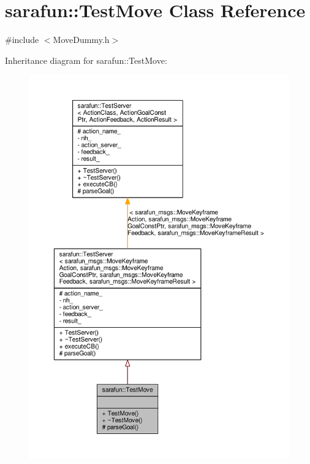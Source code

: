 \hypertarget{classsarafun_1_1TestMove}{\section{sarafun\-:\-:Test\-Move Class Reference}
\label{classsarafun_1_1TestMove}
}


{\ttfamily \#include $<$Move\-Dummy.\-h$>$}



Inheritance diagram for sarafun\-:\-:Test\-Move\-:\nopagebreak
\begin{figure}[H]
\begin{center}
\leavevmode
\includegraphics[width=350pt]{d2/d4d/classsarafun_1_1TestMove__inherit__graph}
\end{center}
\end{figure}


